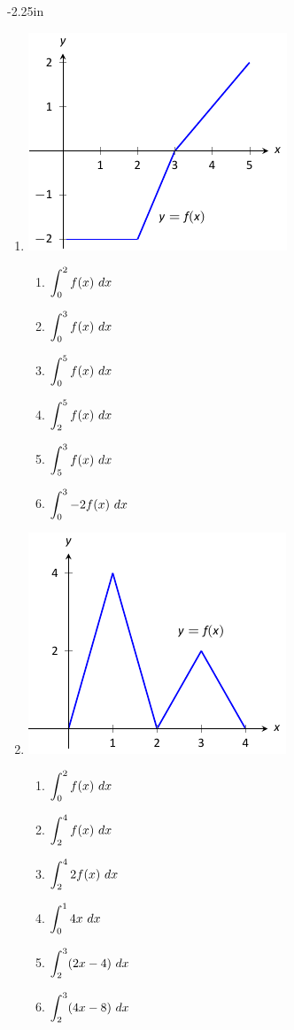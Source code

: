 \begin{adjustwidth*}{}{-2.25in}
\begin{multicols*}{2}
\begin{enumerate}[1),resume]
\item\noindent
\begin{minipage}{\linewidth}
\includegraphics[scale=.8]{figures/fig05_02_ex_06}
\end{minipage}
\bmtwo
\begin{enumerate}
\item		$\displaystyle \int_0^2 f(x)\ dx$
\item		$\displaystyle \int_0^3 f(x)\ dx$
\item		$\displaystyle \int_0^5 f(x)\ dx$
\item		$\displaystyle \int_2^5 f(x)\ dx$
\item		$\displaystyle \int_5^3 f(x)\ dx$
\item		$\ds \int_0^3 -2f(x)\ dx$
\end{enumerate}
\emtwo

\item \noindent
\begin{minipage}{\linewidth}
\includegraphics[scale=.8]{figures/fig05_02_ex_07}
\end{minipage}
\bmtwo
\begin{enumerate}
\item		$\displaystyle \int_0^2 f(x)\ dx$
\item		$\displaystyle \int_2^4 f(x)\ dx$
\item		$\ds \int_2^4 2f(x)\ dx$
\item		$\displaystyle \int_0^1 4x\ dx$
\item		$\ds \int_2^3 (2x-4)\ dx$
\item		$\ds \int_2^3 (4x-8)\ dx$
\end{enumerate}
\emtwo


\end{enumerate}
\end{multicols*}
\end{adjustwidth*}
